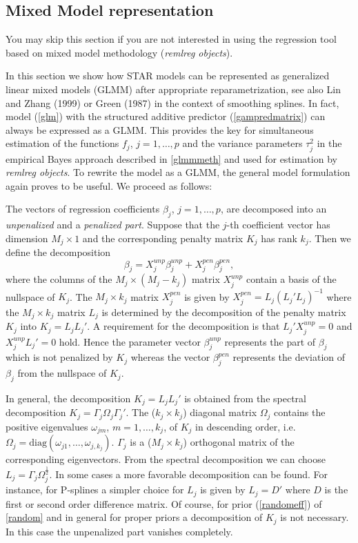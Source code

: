 \documentclass[11pt,a4paper,twoside]{bayesxarticle}
\newcommand{\diag}{\mbox{diag}}
\begin{document}
\subsection{Mixed Model representation}
\label{glmmrep}

You may skip this section if you are not interested in using the
regression tool based on mixed model methodology ({\em remlreg
objects}).

In this section we show how STAR models can be represented as
generalized linear mixed models (GLMM) after appropriate
reparametrization, see also Lin and Zhang (1999) or Green (1987) in
the context of smoothing splines. In fact, model (\ref{glm}) with
the structured additive predictor (\ref{gampredmatrix}) can always
be expressed as a GLMM. This provides the key for simultaneous
estimation of the functions $f_j$, $j=1,\dots,p$ and the variance
parameters $\tau^2_j$ in the empirical Bayes approach described in
\autoref{glmmmeth} and used for estimation by {\em remlreg objects}.
To rewrite the model as a GLMM, the general model formulation again
proves to be useful. We proceed as follows:

The  vectors of regression coefficients $\beta_j$, $j=1,\dots,p$,
are decomposed into an {\em unpenalized} and a {\em penalized part}.
Suppose that the $j$-th coefficient vector has dimension $M_j \times
1$ and the corresponding penalty matrix $K_j$ has rank $k_j$. Then
we define the decomposition
\begin{equation}
\label{decompbeta} \beta_j = X_j^{unp} \beta_j^{unp} + X_j^{pen}
\beta_j^{pen},
\end{equation}
where the columns of the $M_j \times (M_j - k_j)$ matrix $X_j^{unp}$
contain a basis of the nullspace of $K_j$. The  $M_j \times k_j$
matrix $X_j^{pen}$ is given by $X_j^{pen} = L_j(L_j'L_j)^{-1}$ where
the $M_j \times k_j$ matrix $L_j$ is determined by the decomposition
of the penalty matrix $K_j$ into $K_j = L_jL_j'$. A requirement for
the decomposition is that $L_j'X_j^{unp} = 0$ and $X_j^{unp}L_j' =
0$ hold. Hence the parameter vector $\beta_j^{unp}$ represents the
part of $\beta_j$ which is not penalized by $K_j$ whereas the vector
$\beta_j^{pen}$ represents the deviation of $\beta_j$ from the
nullspace of $K_j$.

In general, the decomposition $K_j=L_jL_j'$ is obtained from the
spectral decomposition $K_j = \Gamma_j \Omega_j \Gamma_j'$. The
($k_j \times k_j$)  diagonal matrix $\Omega_j$ contains the positive
eigenvalues $\omega_{jm}$, $m=1,\dots,k_j$, of $K_j$ in descending
order, i.e. $\Omega_j = \diag(\omega_{j1},\dots,\omega_{j,k_j})$.
$\Gamma_j$ is a ($M_j \times k_j$) orthogonal matrix of the
corresponding eigenvectors. From the spectral decomposition we can
choose $L_j = \Gamma_j \Omega_j^{\frac{1}{2}}$. In some cases a more
favorable decomposition can be found. For instance, for P-splines a
simpler choice for $L_j$ is given by $L_j = D'$ where $D$ is the
first or second order difference matrix. Of course, for  prior
(\ref{randomeff}) of \autoref{random} and in general for proper
priors a decomposition of $K_j$ is not necessary. In this case the
unpenalized part vanishes completely.
\end{document}
